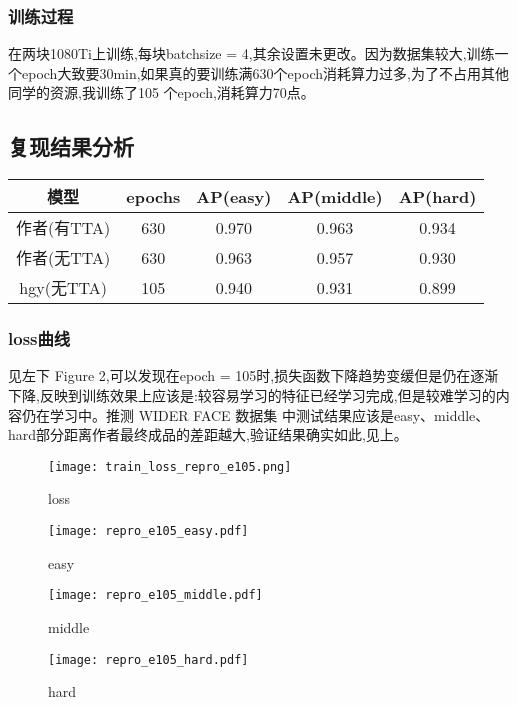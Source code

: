 \documentclass[10pt,a4paper]{article}%
\begin{document}
	\subsubsection*{训练过程}
	在两块1080Ti上训练,每块batchsize = 4,其余设置未更改。因为数据集较大,训练一个epoch大致要30min,如果真的要训练满630个epoch消耗算力过多,为了不占用其他同学的资源,我训练了105
	个epoch,消耗算力70点。

	\subsection{复现结果分析}
	\begin{center}
	\begin{tabular}{|c| c||c|c|c|}
		\hline
		模型 & epochs & AP(easy)& AP(middle) & AP(hard)\\
		\hline
		作者(有TTA) & 630 & 0.970 & 0.963 &	0.934\\
		\hline
		作者(无TTA) & 630 & 0.963 & 0.957 &	0.930\\
		\hline
		hgy(无TTA) & 105 & 0.940 & 0.931 &	0.899\\
		\hline
	\end{tabular}
	\end{center}
	\subsubsection{loss曲线}
	见左下 Figure 2,可以发现在epoch = 105时,损失函数下降趋势变缓但是仍在逐渐下降,反映到训练效果上应该是:较容易学习的特征已经学习完成,但是较难学习的内容仍在学习中。推测 WIDER FACE 数据集
	中测试结果应该是easy、middle、hard部分距离作者最终成品的差距越大,验证结果确实如此,见上。
	\begin{figure}[H]%
		\centering
		\begin{minipage}{0.48\textwidth}
			\centering
			\texttt{[image: train\_loss\_repro\_e105.png]}
			\caption{\fontsize{10pt}{15pt}\selectfont loss}
		\end{minipage}
		\hspace{0cm}%
		\hfill%
		\begin{minipage}{0.48\textwidth}
			\centering
			\texttt{[image: repro\_e105\_easy.pdf]}
			\caption{\fontsize{10pt}{15pt}\selectfont easy}
		\end{minipage}
	\end{figure}
	\begin{figure}[H]%
		\centering
		\begin{minipage}{0.48\textwidth}
			\centering
			\texttt{[image: repro\_e105\_middle.pdf]}
			\caption{\fontsize{10pt}{15pt}\selectfont middle}
		\end{minipage}
		\hspace{0cm}%
		\hfill%
		\begin{minipage}{0.48\textwidth}
			\centering
			\texttt{[image: repro\_e105\_hard.pdf]}
			\caption{\fontsize{10pt}{15pt}\selectfont hard}
		\end{minipage}
	\end{figure}	
\end{document}
